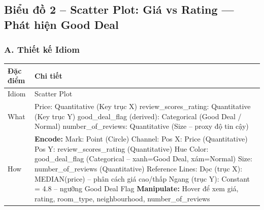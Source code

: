 \subsection{Biểu đồ 2 -- Scatter Plot: Giá vs Rating --- Phát hiện Good Deal}

\subsubsection*{A. Thiết kế Idiom}

\begin{longtable}{|p{2.8cm}|p{11.5cm}|}
\hline
\textbf{Đặc điểm} & \textbf{Chi tiết} \\
\hline
\endhead
\hline
\endfoot
Idiom & Scatter Plot \\
\hline
What & Price: Quantitative (Key trục X) \newline
review\_scores\_rating: Quantitative (Key trục Y) \newline
good\_deal\_flag (derived): Categorical (Good Deal / Normal) \newline
number\_of\_reviews: Quantitative (Size -- proxy độ tin cậy) \\
\hline
How & \textbf{Encode:} \newline
\newline
Mark: Point (Circle) \newline
Channel: \newline
\hspace{0.3cm} Pos X: Price (Quantitative) \newline
\hspace{0.3cm} Pos Y: review\_scores\_rating (Quantitative) \newline
\hspace{0.3cm} Hue Color: good\_deal\_flag (Categorical -- xanh=Good Deal, xám=Normal) \newline
\hspace{0.3cm} Size: number\_of\_reviews (Quantitative) \newline
Reference Lines: \newline
\hspace{0.3cm} Dọc (trục X): MEDIAN(price) -- phân cách giá cao/thấp \newline
\hspace{0.3cm} Ngang (trục Y): Constant = 4.8 -- ngưỡng Good Deal Flag \newline
\newline
\textbf{Manipulate:} \newline
\newline
Hover để xem giá, rating, room\_type, neighbourhood, number\_of\_reviews \newline

\end{longtable}
